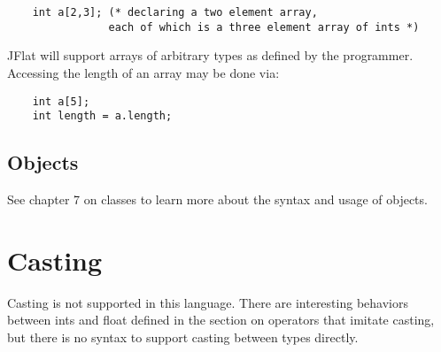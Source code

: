 \begin{homeworkProblem}
	\begin{verbatim}
	int a[2,3]; (* declaring a two element array,
				each of which is a three element array of ints *)
	\end{verbatim}
	
	JFlat will support arrays of arbitrary types as defined by the programmer. Accessing the length of an array may be done via:
	\begin{verbatim}
	int a[5];
	int length = a.length;
	\end{verbatim}
	
	\subsection{Objects}
	
	See chapter 7 on classes to learn more about the syntax and usage of objects.

	\section{Casting}
	Casting is not supported in this language. There are interesting behaviors between ints and float defined in the section on operators that imitate casting, but there is no syntax to support casting between types directly. 

\end{homeworkProblem}
